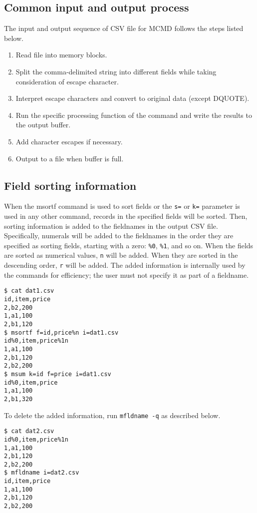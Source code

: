 \subsection{Common input and output process}
The input and output sequence of CSV file for MCMD follows the steps listed below.

\begin{enumerate}
\item Read file into memory blocks.
\item Split the comma-delimited string into different fields while taking consideration of escape character.
\item Interpret escape characters and convert to original data (except DQUOTE).
\item Run the specific processing function of the command and write the results to the output buffer.
\item Add character escapes if necessary.
\item Output to a file when buffer is full.
\end{enumerate}


\subsection{Field sorting information\label{sect:csv_sort}}
When the msortf command is used to sort fields or the \verb|s=| or \verb|k=| parameter is used in any other command, records in the specified fields will be sorted. Then, sorting information is added to the fieldnames in the output CSV file. Specifically, numerals will be added to the fieldnames in the order they are specified as sorting fields, starting with a zero: \verb|%0|, \verb|%1|, and so on. When the fields are sorted as numerical values, \verb|n| will be added. When they are sorted in the descending order, \verb|r| will be added. The added information is internally used by the commands for efficiency; the user must not specify it as part of a fieldname.

\begin{Verbatim}[baselinestretch=0.7,frame=single]
$ cat dat1.csv
id,item,price
2,b2,200
1,a1,100
2,b1,120
$ msortf f=id,price%n i=dat1.csv
id%0,item,price%1n
1,a1,100
2,b1,120
2,b2,200
$ msum k=id f=price i=dat1.csv
id%0,item,price
1,a1,100
2,b1,320
\end{Verbatim}

To delete the added information, run \verb|mfldname -q| as described below.

\begin{Verbatim}[baselinestretch=0.7,frame=single]
$ cat dat2.csv
id%0,item,price%1n
1,a1,100
2,b1,120
2,b2,200
$ mfldname i=dat2.csv
id,item,price
1,a1,100
2,b1,120
2,b2,200
\end{Verbatim}

